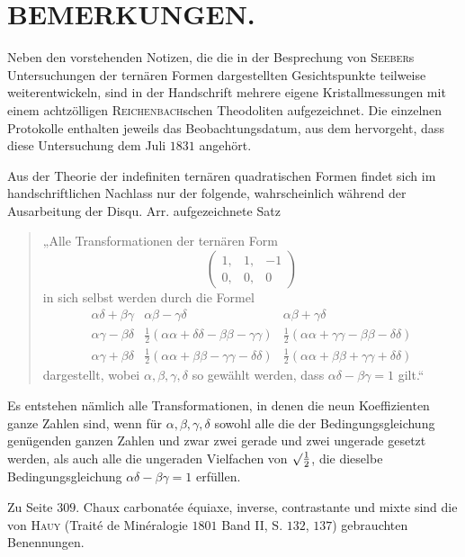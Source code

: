 \clearpage
{}
\section*{BEMERKUNGEN.}
Neben den vorstehenden Notizen, die die in der Besprechung von \textsc{Seeber}s Untersuchungen der ternären Formen dargestellten Gesichtspunkte teilweise weiterentwickeln, sind in der Handschrift mehrere eigene Kristallmessungen mit einem achtzölligen \textsc{Reichenbach}schen Theodoliten aufgezeichnet. Die einzelnen Protokolle enthalten jeweils das Beobachtungsdatum, aus dem hervorgeht, dass diese Untersuchung dem Juli $1831$ angehört.

Aus der Theorie der indefiniten ternären quadratischen Formen findet sich im handschriftlichen Nachlass nur der folgende, wahrscheinlich während der Ausarbeitung der Disqu. Arr. aufgezeichnete Satz
\begin{quote}
„Alle Transformationen der ternären Form
\[
\left(\begin{smallmatrix}1,&1,&-1\\0,&0,&0\end{smallmatrix}\right)
\]
in sich selbst werden durch die Formel
\[
\begin{array}{ccc}
\alpha\delta+\beta\gamma&\alpha\beta-\gamma\delta&\alpha\beta+\gamma\delta\\[.5ex]
\alpha\gamma-\beta\delta&\frac12(\alpha\alpha+\delta\delta-\beta\beta-\gamma\gamma)&\frac12(\alpha\alpha+\gamma\gamma-\beta\beta-\delta\delta)\\[.5ex]
\alpha\gamma+\beta\delta&\frac12(\alpha\alpha+\beta\beta-\gamma\gamma-\delta\delta)&\frac12(\alpha\alpha+\beta\beta+\gamma\gamma+\delta\delta)
\end{array}
\]
dargestellt, wobei $\alpha,\beta,\gamma,\delta$ so gewählt werden, dass $\alpha\delta-\beta\gamma=1$ gilt.“
\end{quote}

Es entstehen nämlich alle Transformationen, in denen die neun Koeffizienten ganze Zahlen sind, wenn für $\alpha,\beta,\gamma,\delta$ sowohl alle die der Bedingungsgleichung genügenden ganzen Zahlen und zwar zwei gerade und zwei ungerade gesetzt werden, als auch alle die ungeraden Vielfachen von $\surd\frac12$, die dieselbe Bedingungsgleichung $\alpha\delta-\beta\gamma=1$ erfüllen.

Zu Seite $309$. Chaux carbonatée équiaxe, inverse, contrastante und mixte sind die von \textsc{Hauy} (Traité de Minéralogie $1801$ Band II, S. $132$, $137$) gebrauchten Benennungen.

